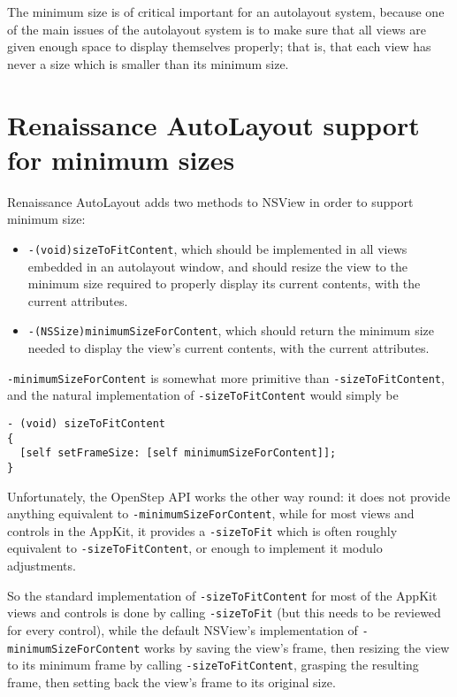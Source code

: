 The minimum size is of critical important for an autolayout system,
because one of the main issues of the autolayout system is to make
sure that all views are given enough space to display themselves
properly; that is, that each view has never a size which is smaller
than its minimum size.

\section{Renaissance AutoLayout support for minimum sizes}
Renaissance AutoLayout adds two methods to NSView in order to support
minimum size:

\begin{itemize}
\item \texttt{-(void)sizeToFitContent}, which should be 
implemented in all views embedded in an autolayout window, and should
resize the view to the minimum size required to properly display its
current contents, with the current attributes.
\item \texttt{-(NSSize)minimumSizeForContent}, which should return the 
minimum size needed to display the view's current contents, with the
current attributes.
\end{itemize}

\texttt{-minimumSizeForContent} is somewhat more primitive than 
\texttt{-sizeToFitContent}, and the natural implementation of 
\texttt{-sizeToFitContent} would simply be
\begin{verbatim}
- (void) sizeToFitContent
{
  [self setFrameSize: [self minimumSizeForContent]];
}
\end{verbatim}

Unfortunately, the OpenStep API works the other way round: it does not
provide anything equivalent to \texttt{-minimumSizeForContent}, while
for most views and controls in the AppKit, it provides a
\texttt{-sizeToFit} which is often roughly equivalent to 
\texttt{-sizeToFitContent}, or enough to implement it modulo adjustments.

So the standard implementation of \texttt{-sizeToFitContent} for most
of the AppKit views and controls is done by calling
\texttt{-sizeToFit} (but this needs to be reviewed for every control),
while the default NSView's implementation of
\texttt{-minimumSizeForContent} works by saving the view's frame, then
resizing the view to its minimum frame by calling
\texttt{-sizeToFitContent}, grasping the resulting frame, then setting
back the view's frame to its original size.


